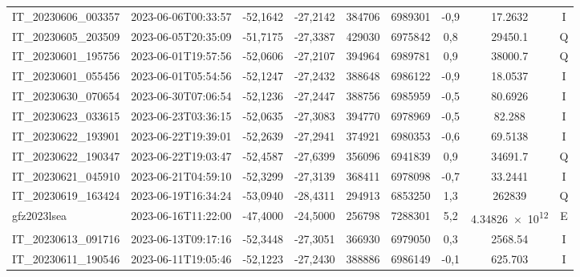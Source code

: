 \begin{center}
\begin{longtable}{lcccccccc}
IT\_20230606\_003357 & 2023-06-06T00:33:57 & -52,1642 & -27,2142 & 384706 & 6989301 & -0,9 & \num[round-precision=3,round-mode=figures,scientific-notation=true]{17.2632} & I \\
IT\_20230605\_203509 & 2023-06-05T20:35:09 & -51,7175 & -27,3387 & 429030 & 6975842 & 0,8 & \num[round-precision=3,round-mode=figures,scientific-notation=true]{29450.1} & Q \\
IT\_20230601\_195756 & 2023-06-01T19:57:56 & -52,0606 & -27,2107 & 394964 & 6989781 & 0,9 & \num[round-precision=3,round-mode=figures,scientific-notation=true]{38000.7} & Q \\
IT\_20230601\_055456 & 2023-06-01T05:54:56 & -52,1247 & -27,2432 & 388648 & 6986122 & -0,9 & \num[round-precision=3,round-mode=figures,scientific-notation=true]{18.0537} & I \\
IT\_20230630\_070654 & 2023-06-30T07:06:54 & -52,1236 & -27,2447 & 388756 & 6985959 & -0,5 & \num[round-precision=3,round-mode=figures,scientific-notation=true]{80.6926} & I \\
IT\_20230623\_033615 & 2023-06-23T03:36:15 & -52,0635 & -27,3083 & 394770 & 6978969 & -0,5 & \num[round-precision=3,round-mode=figures,scientific-notation=true]{82.288} & I \\
IT\_20230622\_193901 & 2023-06-22T19:39:01 & -52,2639 & -27,2941 & 374921 & 6980353 & -0,6 & \num[round-precision=3,round-mode=figures,scientific-notation=true]{69.5138} & I \\
IT\_20230622\_190347 & 2023-06-22T19:03:47 & -52,4587 & -27,6399 & 356096 & 6941839 & 0,9 & \num[round-precision=3,round-mode=figures,scientific-notation=true]{34691.7} & Q \\
IT\_20230621\_045910 & 2023-06-21T04:59:10 & -52,3299 & -27,3139 & 368411 & 6978098 & -0,7 & \num[round-precision=3,round-mode=figures,scientific-notation=true]{33.2441} & I \\
IT\_20230619\_163424 & 2023-06-19T16:34:24 & -53,0940 & -28,4311 & 294913 & 6853250 & 1,3 & \num[round-precision=3,round-mode=figures,scientific-notation=true]{262839} & Q \\
gfz2023lsea & 2023-06-16T11:22:00 & -47,4000 & -24,5000 & 256798 & 7288301 & 5,2 & \num[round-precision=3,round-mode=figures,scientific-notation=true]{4.34826e+12} & E \\
IT\_20230613\_091716 & 2023-06-13T09:17:16 & -52,3448 & -27,3051 & 366930 & 6979050 & 0,3 & \num[round-precision=3,round-mode=figures,scientific-notation=true]{2568.54} & I \\
IT\_20230611\_190546 & 2023-06-11T19:05:46 & -52,1223 & -27,2430 & 388886 & 6986149 & -0,1 & \num[round-precision=3,round-mode=figures,scientific-notation=true]{625.703} & I \\

\end{longtable}
\end{center}
